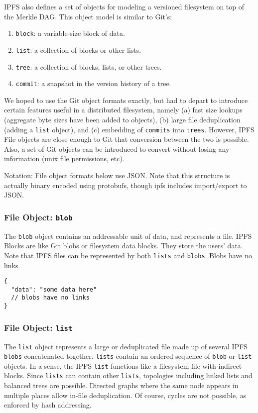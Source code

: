 \documentclass{sig-alternate}
\begin{document}
IPFS also defines a set of objects for modeling a versioned filesystem on top of the Merkle DAG. This object model is similar to Git's:

\begin{enumerate}
  \item \texttt{block}: a variable-size block of data.
  \item \texttt{list}: a collection of blocks or other lists.
  \item \texttt{tree}: a collection of blocks, lists, or other trees.
  \item \texttt{commit}: a snapshot in the version history of a tree.
\end{enumerate}

We hoped to use the Git object formats exactly, but had to depart to introduce certain features useful in a distributed filesystem, namely (a) fast size lookups (aggregate byte sizes have been added to objects), (b) large file deduplication (adding a \texttt{list} object), and (c) embedding of \texttt{commits} into \texttt{trees}. However, IPFS File objects are close enough to Git that conversion between the two is possible. Also, a set of Git objects can be introduced to convert without losing any information (unix file permissions, etc).

Notation: File object formats below use JSON. Note that this structure is actually binary encoded using protobufs, though ipfs includes import/export to JSON.

\subsubsection{File Object: \texttt{blob}}

The \texttt{blob} object contains an addressable unit of data, and
represents a file. IPFS Blocks are like Git blobs or filesystem data blocks. They store the users' data. Note that IPFS files can be represented by both \texttt{lists} and \texttt{blobs}. Blobs have no links.

\begin{verbatim}
{
  "data": "some data here"
  // blobs have no links
}
\end{verbatim}

\subsubsection{File Object: \texttt{list}}

The \texttt{list} object represents a large or deduplicated file made up of
several IPFS \texttt{blobs} concatenated together. \texttt{lists} contain
an ordered sequence of \texttt{blob} or \texttt{list} objects.
In a sense, the IPFS \texttt{list} functions like a filesystem file with
indirect blocks. Since \texttt{lists} can contain other \texttt{lists}, topologies including linked lists and balanced trees are possible. Directed graphs where the same node appears in multiple places allow in-file deduplication. Of course, cycles are not possible, as enforced by hash addressing.
\end{document}
